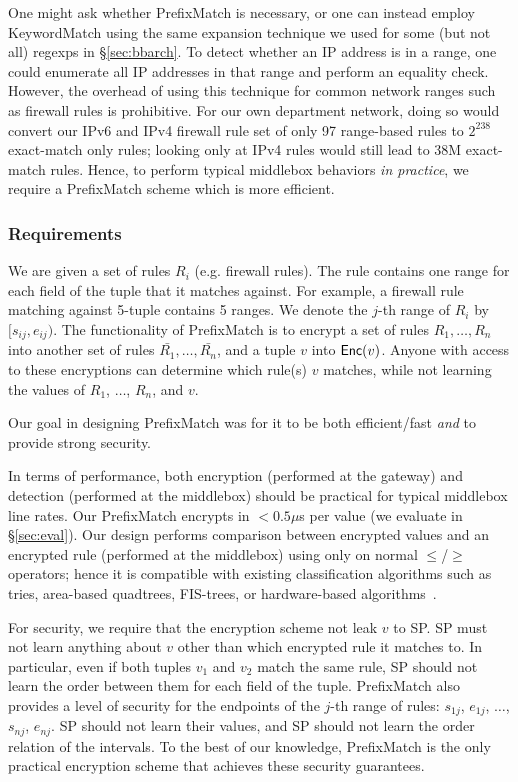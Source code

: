 One might ask whether PrefixMatch is necessary, or one can instead employ KeywordMatch using the same expansion technique we used for some (but not all) regexps in \S\ref{sec:bbarch}. 
To detect whether an IP address is in a range, one could enumerate all IP addresses in that range and perform an equality check. However, the overhead of using this technique for common network ranges such as firewall rules is prohibitive.
For our own department network, doing so would convert our IPv6 and IPv4 firewall rule set of only 97 range-based rules to $2^{238}$ exact-match only rules; looking only at IPv4 rules would still lead to 38M exact-match rules.
Hence, to perform typical middlebox behaviors {\it in practice}, we require a PrefixMatch scheme which is more efficient.

\subsubsection{Requirements}

We are given a set of rules $R_i$ (e.g. firewall rules). The rule contains one range for each field of the tuple that it matches against. For example, a firewall rule matching against 5-tuple contains 5 ranges. We denote the $j$-th range of $R_i$ by $[s_{ij}, e_{ij})$. The functionality of PrefixMatch is to encrypt a set of rules $R_1, \dots, R_n$ into another set of rules $\bar{R_1}, \dots, \bar{R_n}$, and a tuple $v$ into $\mathsf{Enc}(v)$. Anyone with access to these encryptions can determine which rule(s) $v$ matches,  while not learning the values of $R_1$, $\dots$, $R_n$, and $v$. 


Our goal in designing PrefixMatch was for it to be both efficient/fast {\em and} to provide strong security.

In terms of performance, both encryption (performed at the gateway) and detection (performed at the middlebox) should be practical for typical middlebox line rates.
Our PrefixMatch encrypts in $< 0.5\mu$s per value (we evaluate in \S\ref{sec:eval}).
Our design performs comparison between encrypted values and an encrypted rule (performed at the middlebox) using only on normal $\leq$/$\geq$ operators; hence it is compatible with existing classification algorithms such as tries, area-based quadtrees, FIS-trees, or hardware-based algorithms~\cite{packet_classif}.

For security, we require that the encryption scheme not leak $v$ to SP.
SP must not learn anything about $v$ other than which encrypted rule it matches to. 
In particular, even if both tuples $v_1$ and $v_2$ match the same rule, SP should not learn the order between them for each field of the tuple.
PrefixMatch also provides a level of security for the endpoints of the $j$-th range of rules:
 $s_{1j}$, $e_{1j}$, $\dots$, $s_{nj}$, $e_{nj}$. SP should not learn their values, and SP should not learn the order relation of the intervals. To the best of our knowledge, PrefixMatch is the only practical encryption scheme that achieves these security guarantees.

